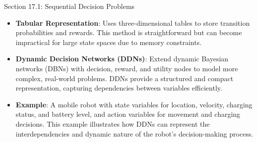 \begin{notes}{Section 17.1: Sequential Decision Problems}
\begin{highlight}
        \begin{itemize}
            \item \textbf{Tabular Representation}: Uses three-dimensional tables to store transition probabilities and rewards. This method is straightforward but can become impractical for large state 
            spaces due to memory constraints.
            \item \textbf{Dynamic Decision Networks (DDNs)}: Extend dynamic Bayesian networks (DBNs) with decision, reward, and utility nodes to model more complex, real-world problems. DDNs provide a 
            structured and compact representation, capturing dependencies between variables efficiently.
            \item \textbf{Example}: A mobile robot with state variables for location, velocity, charging status, and battery level, and action variables for movement and charging decisions. This example 
            illustrates how DDNs can represent the interdependencies and dynamic nature of the robot's decision-making process.
        \end{itemize}
    
    \end{highlight}
    
    \begin{highlight}
    

\end{highlight}
\end{notes}
